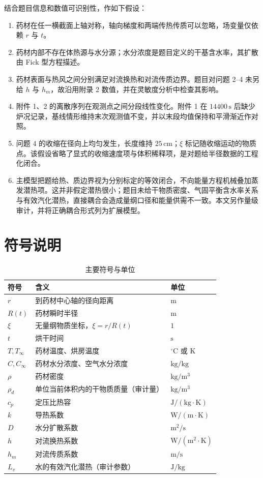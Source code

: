 \documentclass[UTF8,a4paper,zihao=-4,fontset=fandol]{ctexart}
\newcommand{\unit}[1]{\,\mathrm{#1}}
\begin{document}
结合题目信息和数值可识别性，作如下假设：

\begin{enumerate}
  \item 药材在任一横截面上轴对称，轴向梯度和两端传热传质可以忽略，场变量仅依赖 $r$ 与 $t$。
  \item 药材内部不存在体热源与水分源；水分浓度是题目定义的干基含水率，其扩散由 Fick 型方程描述。
  \item 药材表面与热风之间分别满足对流换热和对流传质边界。题目对问题 2--4 未另给 $h$ 与 $h_m$，故沿用附录 2 数值，并在灵敏度分析中检查其影响。
  \item 附件 1、2 的离散序列在观测点之间分段线性变化。附件 1 在 $14400\unit{s}$ 后缺少炉况记录，基线情形维持末次观测值不变，并以末段均值保持和平滑渐近作对照。
  \item 问题 4 的收缩在径向上均匀发生，长度维持 $25\unit{cm}$；$\xi$ 标记随收缩运动的物质点。该假设省略了显式的收缩速度项与体积稀释项，是对题给半径数据的工程化闭合。
  \item 主模型把题给热、质边界视为分别标定的等效闭合，不向能量方程机械叠加蒸发潜热项。这并非假定潜热很小；题目未给干物质密度、气固平衡含水率关系与有效汽化潜热，直接耦合会造成量纲口径和能量供需不一致。本文另作量级审计，并将正确耦合形式列为扩展模型。
\end{enumerate}

\section{符号说明}

\begin{table}[H]
\centering
\caption*{主要符号与单位}
\begin{tabular}{C{2.0cm}L{7.4cm}C{3.0cm}}
\toprule
符号 & 含义 & 单位 \\
\midrule
$r$ & 到药材中心轴的径向距离 & $\mathrm{m}$ \\
$R(t)$ & 药材瞬时半径 & $\mathrm{m}$ \\
$\xi$ & 无量纲物质坐标，$\xi=r/R(t)$ & $1$ \\
$t$ & 烘干时间 & $\mathrm{s}$ \\
$T,T_\infty$ & 药材温度、烘房温度 & $^{\circ}\mathrm{C}$ 或 $\mathrm{K}$ \\
$C,C_\infty$ & 药材水分浓度、空气水分浓度 & $\mathrm{kg/kg}$ \\
$\rho$ & 药材密度 & $\mathrm{kg/m^3}$ \\
$\rho_d$ & 单位当前体积内的干物质质量（审计量） & $\mathrm{kg/m^3}$ \\
$c_p$ & 定压比热容 & $\mathrm{J/(kg\cdot K)}$ \\
$k$ & 导热系数 & $\mathrm{W/(m\cdot K)}$ \\
$D$ & 水分扩散系数 & $\mathrm{m^2/s}$ \\
$h$ & 对流换热系数 & $\mathrm{W/(m^2\cdot K)}$ \\
$h_m$ & 对流传质系数 & $\mathrm{m/s}$ \\
$L_v$ & 水的有效汽化潜热（审计参数） & $\mathrm{J/kg}$ \\
\bottomrule
\end{tabular}
\end{table}
\end{document}
